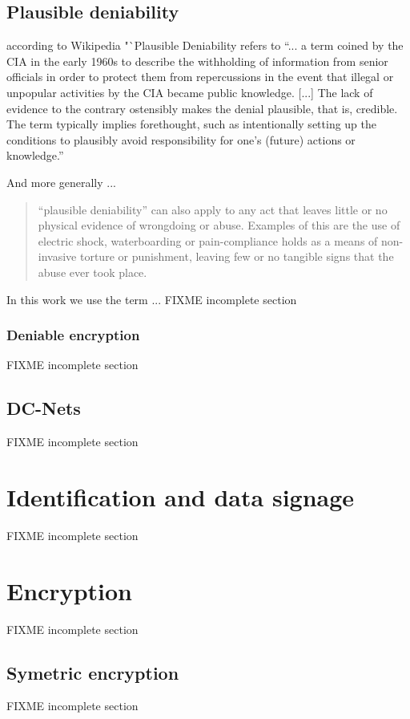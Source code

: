 \subsection{Plausible deniability}
according to Wikipedia\cite{wiki:plausibleDeniability} "`Plausible Deniability refers to "`... a term coined by the CIA in the early 1960s to describe the withholding of information from senior officials in order to protect them from repercussions in the event that illegal or unpopular activities by the CIA became public knowledge. [...]  The lack of evidence to the contrary ostensibly makes the denial plausible, that is, credible. The term typically implies forethought, such as intentionally setting up the conditions to plausibly avoid responsibility for one's (future) actions or knowledge."'\par

And more generally ...
\begin{quote}
"`plausible deniability"' can also apply to any act that leaves little or no physical evidence of wrongdoing or abuse. Examples of this are the use of electric shock, waterboarding or pain-compliance holds as a means of non-invasive torture or punishment, leaving few or no tangible signs that the abuse ever took place.
\end{quote}

In this work we use the term ...
FIXME incomplete section

\subsubsection{Deniable encryption}
\cite{wiki:deniableEncryption}\cite{ccs2011-cirripede}
FIXME incomplete section

\subsection{DC-Nets}
\cite{chaum-dc}
FIXME incomplete section

\section{Identification and data signage}
FIXME incomplete section

\section{Encryption}
FIXME incomplete section

\subsection{Symetric encryption}
FIXME incomplete section

